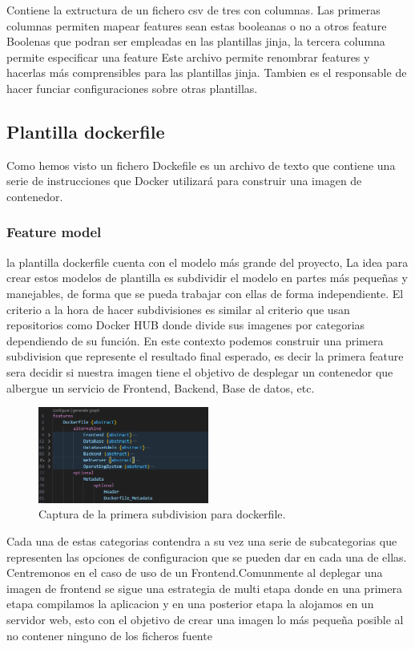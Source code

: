 \documentclass[12pt, a4paper, twoside]{article}
\begin{document}
Contiene la extructura de un fichero csv de tres con columnas. Las primeras columnas permiten mapear features sean estas booleanas o no a otros feature Boolenas que podran ser empleadas en las plantillas jinja, la tercera columna permite especificar una feature
Este archivo permite renombrar features y hacerlas más comprensibles para las plantillas jinja. Tambien es el responsable de hacer funciar configuraciones sobre otras plantillas.

\newpage
\subsection{Plantilla dockerfile}
\label{sec:Plantilla dockerfile}
Como hemos visto un fichero Dockefile es un archivo de texto que contiene una serie de instrucciones que Docker \cite{docker} utilizará para construir una imagen de contenedor.
\subsubsection{Feature model}

la plantilla dockerfile cuenta con el modelo más grande del proyecto, La idea para crear estos modelos de plantilla es subdividir el modelo en partes más pequeñas y manejables, de forma que se pueda trabajar con ellas de forma independiente.
El criterio a la hora de hacer subdivisiones es similar al criterio que usan repositorios como Docker HUB \cite{docker_hub} donde divide sus imagenes por categorias dependiendo de su función.
En este contexto podemos construir una primera subdivision que represente el resultado final esperado, es decir la primera feature sera decidir si nuestra imagen 
tiene el objetivo de desplegar un contenedor que albergue un servicio de Frontend, Backend, Base de datos, etc.

\begin{figure}[h]
	\centering
	  \includegraphics[width=0.5\textwidth]{dockerfile.uvl.png}
	\caption{Captura de la primera subdivision para dockerfile.}
\end{figure}

Cada una de estas categorias contendra a su vez una serie de subcategorias que representen las opciones de configuracion que se pueden dar en cada una de ellas.
\\Centremonos en el caso de uso de un Frontend.Comunmente al deplegar una imagen de frontend se sigue una estrategia de multi etapa \cite{docker_multistage} donde en una primera etapa compilamos la aplicacion 
y en una posterior etapa la alojamos en un servidor web, esto con el objetivo de crear una imagen lo más pequeña posible al no contener ninguno de los ficheros fuente
\end{document}
